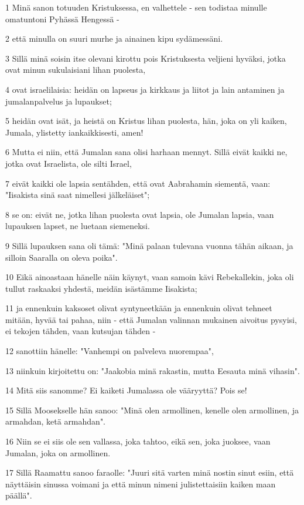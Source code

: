\par 1 Minä sanon totuuden Kristuksessa, en valhettele - sen todistaa minulle omatuntoni Pyhässä Hengessä -
\par 2 että minulla on suuri murhe ja ainainen kipu sydämessäni.
\par 3 Sillä minä soisin itse olevani kirottu pois Kristuksesta veljieni hyväksi, jotka ovat minun sukulaisiani lihan puolesta,
\par 4 ovat israelilaisia: heidän on lapseus ja kirkkaus ja liitot ja lain antaminen ja jumalanpalvelus ja lupaukset;
\par 5 heidän ovat isät, ja heistä on Kristus lihan puolesta, hän, joka on yli kaiken, Jumala, ylistetty iankaikkisesti, amen!
\par 6 Mutta ei niin, että Jumalan sana olisi harhaan mennyt. Sillä eivät kaikki ne, jotka ovat Israelista, ole silti Israel,
\par 7 eivät kaikki ole lapsia sentähden, että ovat Aabrahamin siementä, vaan: "Iisakista sinä saat nimellesi jälkeläiset";
\par 8 se on: eivät ne, jotka lihan puolesta ovat lapsia, ole Jumalan lapsia, vaan lupauksen lapset, ne luetaan siemeneksi.
\par 9 Sillä lupauksen sana oli tämä: "Minä palaan tulevana vuonna tähän aikaan, ja silloin Saaralla on oleva poika".
\par 10 Eikä ainoastaan hänelle näin käynyt, vaan samoin kävi Rebekallekin, joka oli tullut raskaaksi yhdestä, meidän isästämme Iisakista;
\par 11 ja ennenkuin kaksoset olivat syntyneetkään ja ennenkuin olivat tehneet mitään, hyvää tai pahaa, niin - että Jumalan valinnan mukainen aivoitus pysyisi, ei tekojen tähden, vaan kutsujan tähden -
\par 12 sanottiin hänelle: "Vanhempi on palveleva nuorempaa",
\par 13 niinkuin kirjoitettu on: "Jaakobia minä rakastin, mutta Eesauta minä vihasin".
\par 14 Mitä siis sanomme? Ei kaiketi Jumalassa ole vääryyttä? Pois se!
\par 15 Sillä Moosekselle hän sanoo: "Minä olen armollinen, kenelle olen armollinen, ja armahdan, ketä armahdan".
\par 16 Niin se ei siis ole sen vallassa, joka tahtoo, eikä sen, joka juoksee, vaan Jumalan, joka on armollinen.
\par 17 Sillä Raamattu sanoo faraolle: "Juuri sitä varten minä nostin sinut esiin, että näyttäisin sinussa voimani ja että minun nimeni julistettaisiin kaiken maan päällä".
